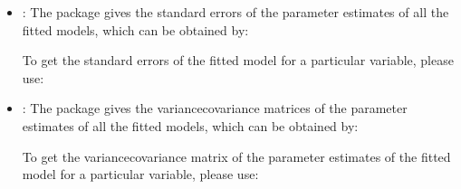 \documentclass[letterpaper,10pt,english]{sphinxmanual}
\begin{document}
\begin{itemize}
\item {} 
\sphinxAtStartPar
{}: The package gives the standard errors of the parameter estimates of all the fitted models, which can be obtained by:
\begin{quote}

\begin{sphinxVerbatim}[commandchars=\\\{\}]
  \PYG{p}{[}\PYG{p}{]}
\end{sphinxVerbatim}
\end{quote}

\sphinxAtStartPar
To get the standard errors of the fitted model for a particular variable, please use:
\begin{quote}

\begin{sphinxVerbatim}[commandchars=\\\{\}]
  \PYG{p}{[}\PYG{p}{]}\PYG{p}{[}\PYG{p}{]}
\end{sphinxVerbatim}
\end{quote}

\item {} 
\sphinxAtStartPar
{}: The package gives the variance\sphinxhyphen{}covariance matrices of the parameter estimates of all the fitted models,
which can be obtained by:
\begin{quote}

\begin{sphinxVerbatim}[commandchars=\\\{\}]
  \PYG{p}{[}\PYG{p}{]}
\end{sphinxVerbatim}
\end{quote}

\sphinxAtStartPar
To get the variance\sphinxhyphen{}covariance matrix of the parameter estimates of the fitted model for a particular variable, please use:
\begin{quote}


\end{quote}
\end{itemize}
\end{document}
